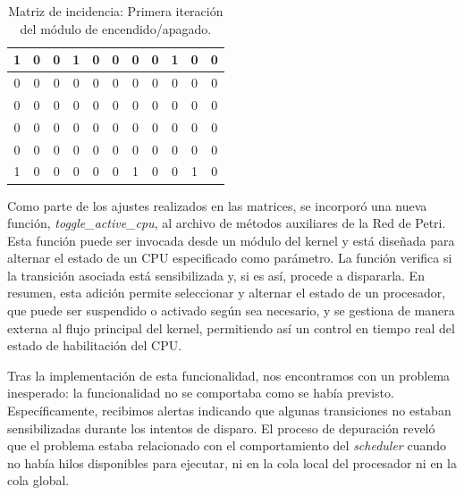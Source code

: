 \begin{table}[H]
    \centering
    \begin{tabular}{|c|c|c|c|c|c|c|c|c|c|c|}
        \hline
        1 & 0 & 0 & 1 & 0 & 0 & 0 & 0 & 1 & \cellcolor{lightgray}0 & \cellcolor{lightgray}0 \\
        \hline
        0 & 0 & 0 & 0 & 0 & 0 & 0 & 0 & 0 & \cellcolor{lightgray}0 & \cellcolor{lightgray}0 \\
        \hline
        0 & 0 & 0 & 0 & 0 & 0 & 0 & 0 & 0 & \cellcolor{lightgray}0 & \cellcolor{lightgray}0 \\
        \hline
        0 & 0 & 0 & 0 & 0 & 0 & 0 & 0 & 0 & \cellcolor{lightgray}0 & \cellcolor{lightgray}0 \\
        \hline
        0 & 0 & 0 & 0 & 0 & 0 & 0 & 0 & 0 & \cellcolor{lightgray}0 & \cellcolor{lightgray}0 \\
        \hline
        \cellcolor{lightgray}1 & \cellcolor{lightgray}0 & \cellcolor{lightgray}0 & \cellcolor{lightgray}0 & \cellcolor{lightgray}0 & \cellcolor{lightgray}0 & \cellcolor{lightgray}1 & \cellcolor{lightgray}0 & \cellcolor{lightgray}0 & \cellcolor{lightgray}1 & \cellcolor{lightgray}0 \\
        \hline
    \end{tabular}
    \caption{Matriz de incidencia: Primera iteración del módulo de encendido/apagado.}
    \label{tabla:matriz_incidencia_post}
\end{table}

Como parte de los ajustes realizados en las matrices, se incorporó una nueva función, \textit{toggle\_active\_cpu}, al archivo de métodos auxiliares de la Red de Petri. Esta función puede ser invocada desde un módulo del kernel y está diseñada para alternar el estado de un CPU especificado como parámetro. La función verifica si la transición asociada está sensibilizada y, si es así, procede a dispararla. En resumen, esta adición permite seleccionar y alternar el estado de un procesador, que puede ser suspendido o activado según sea necesario, y se gestiona de manera externa al flujo principal del kernel, permitiendo así un control en tiempo real del estado de habilitación del CPU.\par

Tras la implementación de esta funcionalidad, nos encontramos con un problema inesperado: la funcionalidad no se comportaba como se había previsto. Específicamente, recibimos alertas indicando que algunas transiciones no estaban sensibilizadas durante los intentos de disparo. El proceso de depuración reveló que el problema estaba relacionado con el comportamiento del \textit{scheduler} cuando no había hilos disponibles para ejecutar, ni en la cola local del procesador ni en la cola global.

